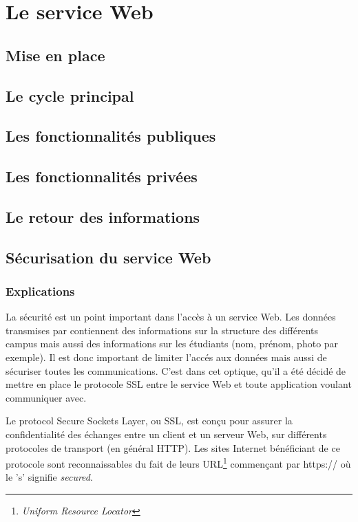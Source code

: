 \section{Le service Web}

\subsection{Mise en place}

\subsection{Le cycle principal}
\label{section:cyclePrincipal}

\subsection{Les fonctionnalit\'es publiques}

\subsection{Les fonctionnalit\'es priv\'ees}

\subsection{Le retour des informations}

\subsection{S\'ecurisation du service Web}
\label{section:securisation}

\subsubsection{Explications}

La s\'ecurit\'e est un point important dans l'acc\`es \`a un service Web. 
Les donn\'ees transmises par \YuukouII{} contiennent des informations sur la structure des diff\'erents campus mais aussi des informations sur les \'etudiants (nom, pr\'enom, photo par exemple).
Il est donc important de limiter l'acc\'es aux donn\'ees mais aussi de s\'ecuriser toutes les communications.
C'est dans cet optique, qu'il a \'et\'e d\'ecid\'e de mettre en place le protocole SSL entre le service Web et toute application voulant communiquer avec.

Le protocol Secure Sockets Layer, ou SSL, est con\c{c}u pour assurer la confidentialit\'e des \'echanges entre un client et un serveur Web, sur diff\'erents protocoles de transport (en g\'en\'eral HTTP).
Les sites Internet b\'en\'eficiant de ce protocole sont reconnaissables du fait de leurs URL\protect\footnote{\textit{Uniform Resource Locator}} commen\c{c}ant par \textsf{https://} o\`u le 's' signifie \textit{secured}.



